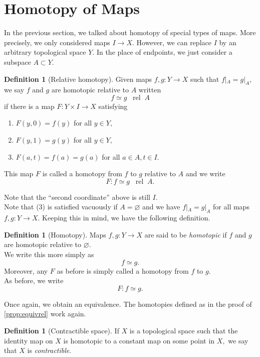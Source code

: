 \documentclass[12pt]{article}
\theoremstyle{definition}
\numberwithin{thm}{section}
\newtheorem{defn}[thm]{Definition}
\let\emptyset\varnothing
\newcommand{\rel}{\;\;\operatorname{rel}\;}
\begin{document}
\section{Homotopy of Maps}
%
In the previous section, we talked about homotopy of special types of maps. More precisely, we only considered maps $I \to X.$ However, we can replace $I$ by an arbitrary topological space $Y.$ In the place of endpoints, we just consider a subspace $A \subset Y.$
\begin{defn}[Relative homotopy]
	Given maps $f, g:Y \to X$ such that $f|_A = g|_A,$ we say $f$ and $g$ are homotopic relative to $A$ written
	\begin{equation*} 
		f \simeq g \rel A
	\end{equation*}
	if there is a map $F:Y \times I \to X$ satisfying
	\begin{enumerate}
		\item $F(y, 0) = f(y)$ for all $y \in Y,$
		\item $F(y, 1) = g(y)$ for all $y \in Y,$
		\item $F(a, t) = f(a) = g(a)$ for all $a \in A, t \in I.$
	\end{enumerate}
	This map $F$ is called a homotopy from $f$ to $g$ relative to $A$ and we write
	\begin{equation*} 
		F:f\simeq g \rel A.
	\end{equation*}
\end{defn}
Note that the ``second coordinate'' above is still $I.$\\
Note that (3) is satisfied vacuously if $A = \emptyset$ and we have $f|_A = g|_A$ for all maps $f, g : Y \to X.$ Keeping this in mind, we have the following definition.
\begin{defn}[Homotopy]
	Maps $f, g:Y \to X$ are said to be \emph{homotopic} if $f$ and $g$ are homotopic relative to $\emptyset.$\\
	We write this more simply as
	\begin{equation*} 
		f \simeq g.
	\end{equation*}
	Moreover, any $F$ as before is simply called a homotopy from $f$ to $g.$\\
	As before, we write
	\begin{equation*} 
		F:f\simeq g.
	\end{equation*}
\end{defn}

Once again, we obtain an equivalence. The homotopies defined as in the proof of \cref{prop:equivrel} work again.
\begin{defn}[Contractible space] \label{def:contrac}
	If $X$ is a topological space such that the identity map on $X$ is homotopic to a constant map on some point in $X,$ we say that $X$ is \emph{contractible}.
\end{defn}
\end{document}
